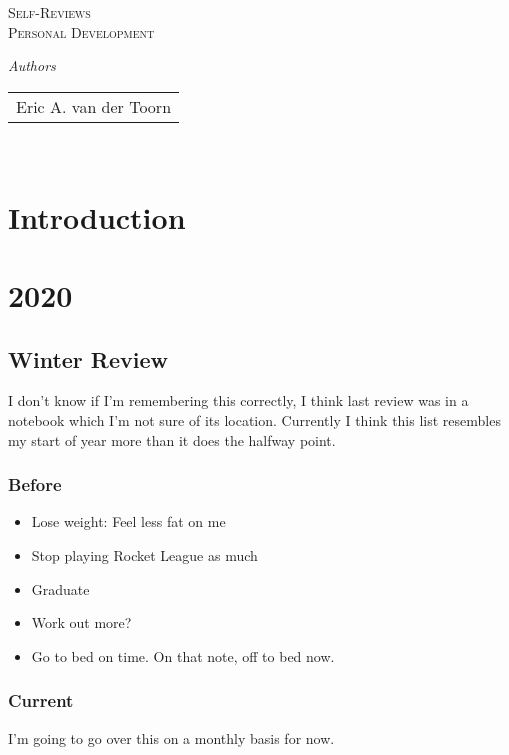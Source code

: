 \documentclass[a4paper]{article}
\begin{document}
\begin{titlepage}

\newcommand{\HRule}{\rule{\linewidth}{0.5mm}}
\center
\textsc{\LARGE Self-Reviews}\\[1cm]

\textsc{\Large Personal Development}\\[0.2cm]

\large

\emph{Authors}\\[2mm]

\begin{tabular}{l }
Eric A. van der Toorn
\end{tabular}\\[0.5cm]

\end{titlepage}

\tableofcontents
\newpage
\section{Introduction}

\newpage
\section{2020}

\subsection{Winter Review}
I don't know if I'm remembering this correctly, I think last review was in a notebook which I'm not sure of its location.
Currently I think this list resembles my start of year more than it does the halfway point.
\subsubsection{Before}
\begin{itemize}
 \item Lose weight: Feel less fat on me
 \item Stop playing Rocket League as much
 \item Graduate
 \item Work out more?
 \item Go to bed on time. On that note, off to bed now.
\end{itemize}

\subsubsection{Current}
I'm going to go over this on a monthly basis for now.
\end{document}
